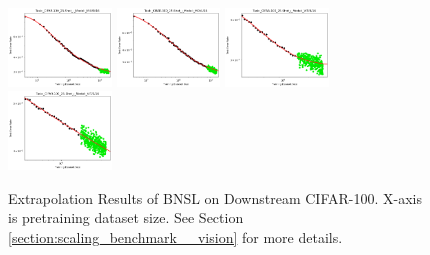 \documentclass{article} %
\begin{document}
\begin{figure}
\includegraphics[width=0.245\textwidth]{figures/scaling_laws_benchmark_dataset_plots/c100_25___MiX_B_16.png}
\includegraphics[width=0.245\textwidth]{figures/scaling_laws_benchmark_dataset_plots/c100_25___MiX_L_16.png}
\includegraphics[width=0.245\textwidth]{figures/scaling_laws_benchmark_dataset_plots/c100_25___ViT_B_16.png}
\includegraphics[width=0.245\textwidth]{figures/scaling_laws_benchmark_dataset_plots/c100_25___ViT_S_16.png}

    \caption{
    Extrapolation Results of BNSL on Downstream CIFAR-100. X-axis is pretraining dataset size. See Section \ref{section:scaling_benchmark__vision} for more details.
    }
    \label{fig:scaling_laws_benchmark_dataset__cifar_100}
\end{figure}
\end{document}

